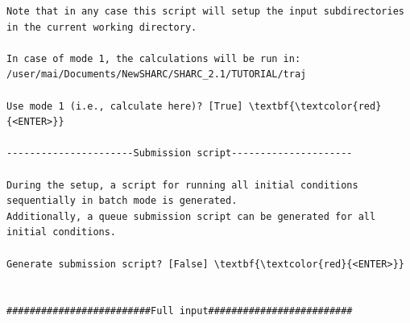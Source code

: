\documentclass[a4paper,11pt,DIV=15,openany]{scrbook}
\begin{document}
\begin{oframed}
\begin{Verbatim}[commandchars=\\\{\}]
Note that in any case this script will setup the input subdirectories in the current working directory.

In case of mode 1, the calculations will be run in:
/user/mai/Documents/NewSHARC/SHARC_2.1/TUTORIAL/traj

Use mode 1 (i.e., calculate here)? [True] \textbf{\textcolor{red}{<ENTER>}}

----------------------Submission script---------------------

During the setup, a script for running all initial conditions sequentially in batch mode is generated. 
Additionally, a queue submission script can be generated for all initial conditions.

Generate submission script? [False] \textbf{\textcolor{red}{<ENTER>}}


#########################Full input#########################


\end{Verbatim}
\end{oframed}
\end{document}
